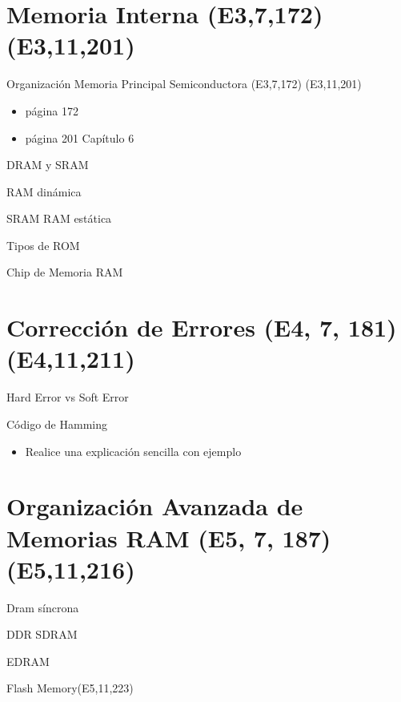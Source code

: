 \documentclass[presentation]{beamer}
\begin{document}
\section{Memoria Interna (E3,7,172)(E3,11,201)}
\label{sec:org168de22}
\begin{frame}[label={sec:orga7882f7}]{Organización Memoria Principal Semiconductora (E3,7,172) (E3,11,201)}
\begin{itemize}
\item \autocite{stallings2006} página 172
\item \autocite{stallings2022computer} página 201 Capítulo 6
\end{itemize}
\end{frame}
\begin{frame}[label={sec:org0f75759}]{DRAM y SRAM}
\end{frame}
\begin{frame}[label={sec:orga42a711}]{RAM dinámica}
\end{frame}
\begin{frame}[label={sec:org8c7bcee}]{SRAM RAM estática}
\end{frame}
\begin{frame}[label={sec:orgec5a4db}]{Tipos de ROM}
\end{frame}
\begin{frame}[label={sec:org876cf24}]{Chip de Memoria RAM}
\end{frame}
\section{Corrección de Errores (E4, 7, 181)(E4,11,211)}
\label{sec:org9cbfe42}
\begin{frame}[label={sec:orgcb28f77}]{Hard Error vs Soft Error}
\end{frame}
\begin{frame}[label={sec:org0545cde}]{Código de Hamming}
\begin{itemize}
\item Realice una explicación sencilla con ejemplo
\end{itemize}
\end{frame}
\section{Organización Avanzada de Memorias RAM (E5, 7, 187)(E5,11,216)}
\label{sec:org55d01b7}
\begin{frame}[label={sec:org8c229ba}]{Dram síncrona}
\end{frame}
\begin{frame}[label={sec:orgaee377f}]{DDR SDRAM}
\end{frame}
\begin{frame}[label={sec:org9db7df4}]{EDRAM}
\end{frame}
\begin{frame}[label={sec:org7c59c9e}]{Flash Memory(E5,11,223)}
\end{frame}
\end{document}
